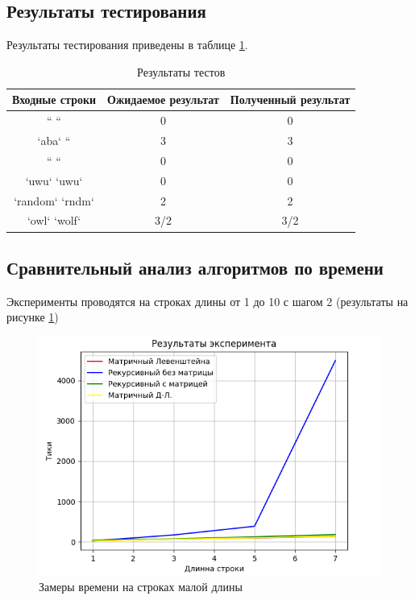 \documentclass{article}
\begin{document}
	\subsection{Результаты тестирования}
	Результаты тестирования приведены в таблице \ref{testTable}.
	\newline
	\begin{table}
	\centering
		\caption{Результаты тестов} \label{testTable}
	\begin{tabular}{| c | c | c |}
	\hline
	Входные строки & Ожидаемое результат & Полученный результат \\ \hline
	`` `` & 0 & 0 \\ \hline
		`aba` `` & 3 & 3 \\ \hline
			`` `` & 0 & 0 \\ \hline
				`uwu` `uwu` & 0 & 0 \\ \hline
					`random` `rndm` & 2 & 2 \\ \hline
						`owl` `wolf` & 3/2 & 3/2 \\ \hline
	\end{tabular}
	\end{table}
	\subsection{Сравнительный анализ алгоритмов по времени}
	Эксперименты проводятся на строках длины от 1 до 10 с шагом 2 (результаты на рисунке \ref{smallTest})
		\begin{figure}[h!]
		 	\includegraphics[scale=0.9]{smallTest}
		 	\caption{Замеры времени на строках малой длины}
		 	\label{smallTest}
	 	\end{figure}
	 	
\end{document}
